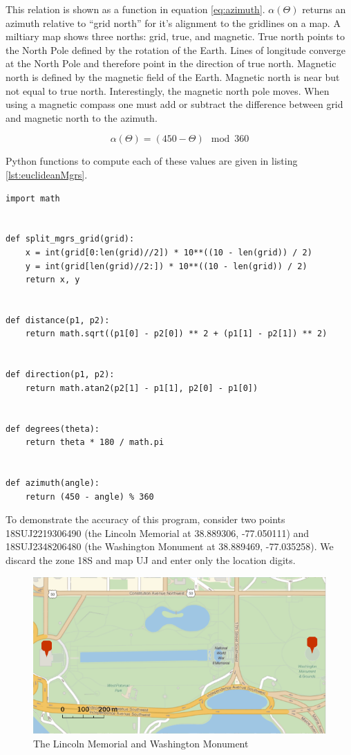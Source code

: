 \documentclass{book}
\begin{document}
This relation is shown as a function in equation \ref{eq:azimuth}. $\alpha(\Theta)$  returns an azimuth relative to ``grid north'' for it's alignment to the gridlines on a map. A miltiary map shows three norths: grid, true, and magnetic. True north points to the North Pole defined by the rotation of the Earth. Lines of longitude converge at the North Pole and therefore point in the direction of true north. Magnetic north is defined by the magnetic field of the Earth. Magnetic north is near but not equal to true north. Interestingly, the magnetic north pole moves. When using a magnetic compass one must add or subtract the difference between grid and magnetic north to the azimuth.

\begin{equation}
  \label{eq:azimuth}
  \alpha(\Theta) = (450 - \Theta) \mod{360}
\end{equation}

Python functions to compute each of these values are given in listing \ref{lst:euclideanMgrs}.

\begin{lstlisting}[float,caption={Euclidean distance and direction functions in Python},captionpos=b,label={lst:euclideanMgrs}]
import math


def split_mgrs_grid(grid):
	x = int(grid[0:len(grid)//2]) * 10**((10 - len(grid)) / 2)
	y = int(grid[len(grid)//2:]) * 10**((10 - len(grid)) / 2)
	return x, y


def distance(p1, p2):
	return math.sqrt((p1[0] - p2[0]) ** 2 + (p1[1] - p2[1]) ** 2)


def direction(p1, p2):
	return math.atan2(p2[1] - p1[1], p2[0] - p1[0])


def degrees(theta):
	return theta * 180 / math.pi


def azimuth(angle):
	return (450 - angle) % 360
\end{lstlisting}

To demonstrate the accuracy of this program, consider two points 18SUJ2219306490 (the Lincoln Memorial at 38.889306, -77.050111) and 18SUJ2348206480 (the Washington Monument at 38.889469, -77.035258). We discard the zone 18S and map UJ and enter only the location digits.

\begin{figure}[h]
\centering
\includegraphics[width=.75\textwidth,keepaspectratio]{figures/washington-lincoln}
\caption{The Lincoln Memorial and Washington Monument}
\end{figure}
\end{document}
